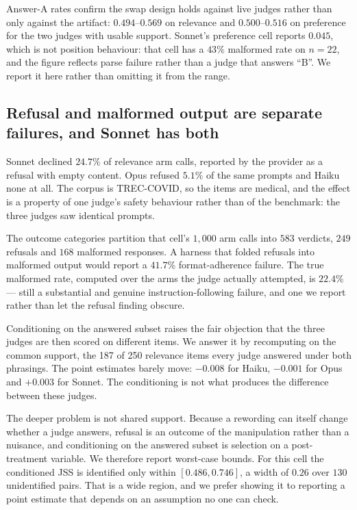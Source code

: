 Answer-A rates confirm the swap design holds against live judges rather than only
against the artifact: $0.494$--$0.569$ on relevance and $0.500$--$0.516$ on
preference for the two judges with usable support. Sonnet's preference cell
reports $0.045$, which is not position behaviour: that cell has a $43\%$
malformed rate on $n=22$, and the figure reflects parse failure rather than a
judge that answers ``B''. We report it here rather than omitting it from the
range.

\subsection{Refusal and malformed output are separate failures, and Sonnet has both}
\label{sec:results-refusal}

Sonnet declined $24.7\%$ of relevance arm calls, reported by the provider as a
refusal with empty content. Opus refused $5.1\%$ of the same prompts and Haiku
none at all. The corpus is TREC-COVID, so the items are medical, and the effect
is a property of one judge's safety behaviour rather than of the benchmark: the
three judges saw identical prompts.

The outcome categories partition that cell's $1{,}000$ arm calls into $583$
verdicts, $249$ refusals and $168$ malformed responses. A harness that folded
refusals into malformed output would report a $41.7\%$ format-adherence failure.
The true malformed rate, computed over the arms the judge actually attempted, is
$22.4\%$ --- still a substantial and genuine instruction-following failure, and
one we report rather than let the refusal finding obscure.

Conditioning on the answered subset raises the fair objection that the three
judges are then scored on different items. We answer it by recomputing on the
common support, the 187 of 250 relevance items every judge answered under both
phrasings. The point estimates barely move: $-0.008$ for Haiku, $-0.001$ for
Opus and $+0.003$ for Sonnet. The conditioning is not what produces the
difference between these judges.

The deeper problem is not shared support. Because a rewording can itself change
whether a judge answers, refusal is an outcome of the manipulation rather than a
nuisance, and conditioning on the answered subset is selection on a
post-treatment variable. We therefore report
worst-case bounds. For this cell the conditioned JSS is identified only within
$[0.486, 0.746]$, a width of $0.26$ over $130$ unidentified pairs. That is a wide
region, and we prefer showing it to reporting a point estimate that depends on an
assumption no one can check.

